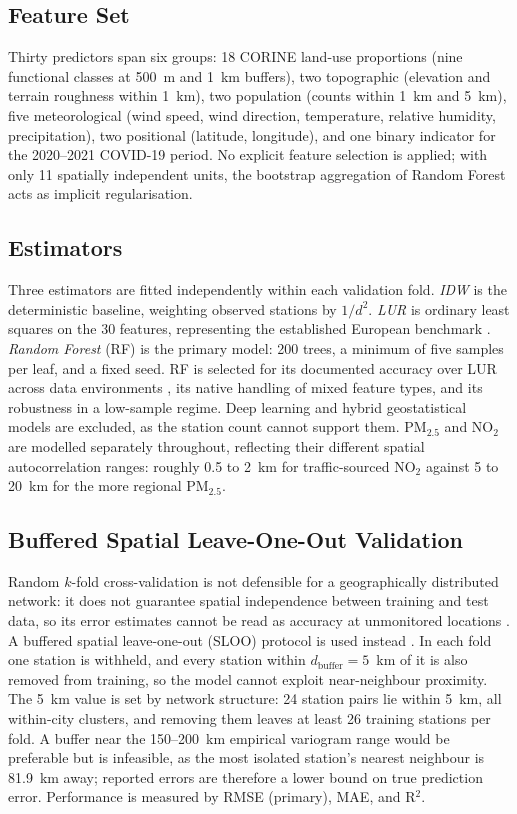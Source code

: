 \documentclass[conference]{IEEEtran}
\begin{document}
\subsection{Feature Set}

Thirty predictors span six groups: 18 CORINE land-use proportions (nine
functional classes at 500~m and 1~km buffers), two topographic (elevation and
terrain roughness within 1~km), two population (counts within 1~km and 5~km),
five meteorological (wind speed, wind direction, temperature, relative
humidity, precipitation), two positional (latitude, longitude), and one binary
indicator for the 2020--2021 COVID-19 period. No explicit feature selection is
applied; with only 11 spatially independent units, the bootstrap aggregation
of Random Forest acts as implicit regularisation.

\subsection{Estimators}

Three estimators are fitted independently within each validation fold.
\textit{IDW} is the deterministic baseline, weighting observed stations by
$1/d^{2}$. \textit{LUR} is ordinary least squares on the 30 features,
representing the established European benchmark \cite{hoek_lur_review_2008}.
\textit{Random Forest} (RF) is the primary model: 200 trees, a minimum of five
samples per leaf, and a fixed seed. RF is selected for its documented accuracy
over LUR across data environments \cite{agbehadji_ml_aq_review_2024,
chen_pm25_interpolation_2021}, its native handling of mixed feature types, and
its robustness in a low-sample regime. Deep learning and hybrid geostatistical
models are excluded, as the station count cannot support them. PM$_{2.5}$ and
NO$_2$ are modelled separately throughout, reflecting their different spatial
autocorrelation ranges: roughly 0.5 to 2~km for traffic-sourced NO$_2$ against
5 to 20~km for the more regional PM$_{2.5}$.

\subsection{Buffered Spatial Leave-One-Out Validation}

Random $k$-fold cross-validation is not defensible for a geographically
distributed network: it does not guarantee spatial independence between
training and test data, so its error estimates cannot be read as accuracy at
unmonitored locations \cite{roberts_spatial_cv_2017}. A buffered spatial
leave-one-out (SLOO) protocol is used instead \cite{valavi_blockcv_2019}. In
each fold one station is withheld, and every station within
$d_{\text{buffer}} = 5$~km of it is also removed from training, so the model
cannot exploit near-neighbour proximity. The 5~km value is set by network
structure: 24 station pairs lie within 5~km, all within-city clusters, and
removing them leaves at least 26 training stations per fold. A buffer near the
150--200~km empirical variogram range would be preferable but is infeasible,
as the most isolated station's nearest neighbour is 81.9~km away; reported
errors are therefore a lower bound on true prediction error. Performance is
measured by RMSE (primary), MAE, and R$^2$.
\end{document}
